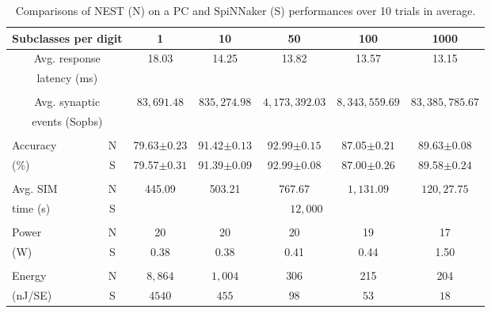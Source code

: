 \documentclass{frontiersENG} %
\begin{document}
\begin{table}[h]
	\caption{Comparisons of NEST (N) on a PC and SpiNNaker (S) performances over 10 trials in average.}
	\begin{center}
    \bgroup
    \def\arraystretch{1.4}
		\begin{tabular} {l| c  c c c c c}
		\multicolumn{2}{c}{Subclasses per digit} 
		& 1 & 10 & 50 & 100 & 1000 \\
		\hline
		\multicolumn{2}{c}{Avg. response}
		& \multirow{2}{*}{18.03} %
		& \multirow{2}{*}{14.25} %
		& \multirow{2}{*}{13.82} %
		& \multirow{2}{*}{13.57} %
		& \multirow{2}{*}{13.15} %
		\\
		\multicolumn{2}{c}{latency (ms)}
		& & & & &
		\\
    \multicolumn{7}{c}{\vspace*{-3mm}}\\
		\multicolumn{2}{c}{Avg. synaptic}
		& \multirow{2}{*}{$83,691.48$}
		& \multirow{2}{*}{$835,274.98$}
		& \multirow{2}{*}{$4,173,392.03$}
		& \multirow{2}{*}{$8,343,559.69$}
		& \multirow{2}{*}{$83,385,785.67$}
		\\	
		\multicolumn{2}{c}{events (Sopbs)}
		& & & & &
		\\
    \multicolumn{7}{c}{\vspace*{-3mm}}\\
		Accuracy
		& N 
		& 79.63$\pm0.23$
		& 91.42$\pm0.13$ 
		& 92.99$\pm0.15$
		& 87.05$\pm0.21$
		& 89.63$\pm0.08$
		\\
		(\%)
		& S
		& 79.57$\pm0.31$
		& 91.39$\pm0.09$
		& 92.99$\pm0.08$
		& 87.00$\pm0.26$
		& 89.58$\pm0.24$
		\\
    & &\multicolumn{5}{c}{\vspace*{-4mm}}\\
		Avg. SIM
		& N 
		& 445.09
		& 503.21
		& 767.67
		& $1,131.09$
		& $120,27.75$
		\\
		time (s)
		& S
		& \multicolumn{5}{c}{$12,000$}
		\\
    & &\multicolumn{5}{c}{\vspace*{-4mm}}\\
		Power
		& N 
		& 20
		& 20
		& 20
		& 19
		& 17
		\\
		(W) %
		& S
		& 0.38 
		& 0.38 
		& 0.41
		& 0.44
		& 1.50
		\\
    & &\multicolumn{5}{c}{\vspace*{-4mm}}\\
		Energy
		& N 
		& $8,864$
		& $1,004$
		& 306
		& 215
		& 204
		\\
		(nJ/SE) %
		& S
		& $4540$
		& $ 455 $
		& $ 98 $
		& $ 53 $
		& $ 18 $
		\\
			

\end{tabular}
\end{center}
\end{table}
\end{document}
